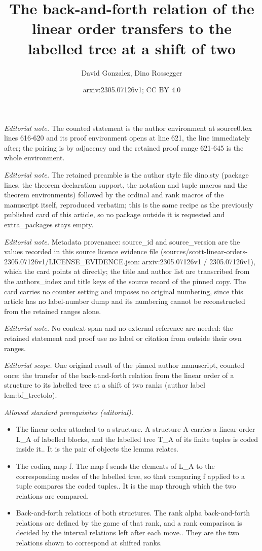 \documentclass[10pt,a4paper]{amsart}
\title{The back-and-forth relation of the linear order transfers to the labelled tree at a shift of two}
\author{David Gonzalez, Dino Rossegger}
\date{arxiv:2305.07126v1; CC BY 4.0}
\begin{document}
\maketitle
\noindent\textit{Editorial note.} The counted statement is the author environment at source0.tex lines 616-620 and its proof environment opens at line 621, the line immediately after; the pairing is by adjacency and the retained proof range 621-645 is the whole environment.\par\medskip
\noindent\textit{Editorial note.} The retained preamble is the author style file dino.sty (package lines, the theorem declaration support, the notation and tuple macros and the theorem environments) followed by the ordinal and rank macros of the manuscript itself, reproduced verbatim; this is the same recipe as the previously published card of this article, so no package outside it is requested and extra\_packages stays empty.\par\medskip
\noindent\textit{Editorial note.} Metadata provenance: source\_id and source\_version are the values recorded in this source licence evidence file (sources/scott-linear-orders-2305.07126v1/LICENSE\_EVIDENCE.json: arxiv:2305.07126v1 / 2305.07126v1), which the card points at directly; the title and author list are transcribed from the authors\_index and title keys of the source record of the pinned copy. The card carries no counter setting and imposes no original numbering, since this article has no label-number dump and its numbering cannot be reconstructed from the retained ranges alone.\par\medskip
\noindent\textit{Editorial note.} No context span and no external reference are needed: the retained statement and proof use no label or citation from outside their own ranges.\par\medskip
\noindent\textit{Editorial scope.} One original result of the pinned author manuscript, counted once: the transfer of the back-and-forth relation from the linear order of a structure to its labelled tree at a shift of two ranks (author label lem:bf\_treetolo).\par\medskip
\noindent\textit{Allowed standard prerequisites (editorial).}\begin{itemize}
\item The linear order attached to a structure. A structure A carries a linear order L\_A of labelled blocks, and the labelled tree T\_A of its finite tuples is coded inside it.. It is the pair of objects the lemma relates.
\item The coding map f. The map f sends the elements of L\_A to the corresponding nodes of the labelled tree, so that comparing f applied to a tuple compares the coded tuples.. It is the map through which the two relations are compared.
\item Back-and-forth relations of both structures. The rank alpha back-and-forth relations are defined by the game of that rank, and a rank comparison is decided by the interval relations left after each move.. They are the two relations shown to correspond at shifted ranks.
\end{itemize}\medskip
\end{document}
